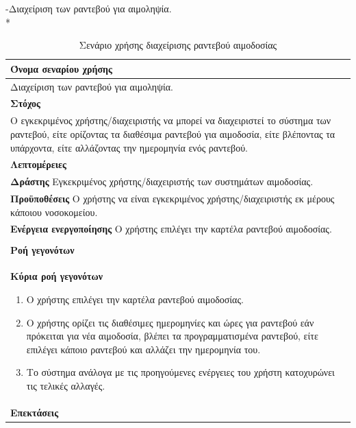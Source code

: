 -Διαχείριση των ραντεβού για αιμοληψία.
\\*
\begin{table}[H]
	\begin{center}
	    \begin{tabular}{|p{\dimexpr \linewidth-2\tabcolsep}|}
	    \hline
	    \rowcolor{grayy}
	    \textbf{Όνομα σεναρίου χρήσης}
	    \\ \hline    
	     Διαχείριση των ραντεβού για αιμοληψία.
	     \\ \hline
	    \rowcolor{grayy}
	    \textbf{\textbf{Στόχος}}
	    \\ \hline
	 	 Ο εγκεκριμένος χρήστης/διαχειριστής να μπορεί να διαχειριστεί το σύστημα των ραντεβού, είτε ορίζοντας τα διαθέσιμα ραντεβού για αιμοδοσία, είτε βλέποντας τα υπάρχοντα, είτε αλλάζοντας την ημερομηνία ενός ραντεβού.
	    \\ \hline
	    \rowcolor{grayy}
	    \textbf{Λεπτομέρειες}
	    \\ \hline
		\textbf{Δράστης} Εγκεκριμένος χρήστης/διαχειριστής των συστημάτων αιμοδοσίας.
		\\*
		\textbf{Προϋποθέσεις} Ο χρήστης να είναι εγκεκριμένος χρήστης/διαχειριστής εκ μέρους κάποιου νοσοκομείου.
		\\*
		\textbf{Ενέργεια ενεργοποίησης} Ο χρήστης επιλέγει την καρτέλα ραντεβού αιμοδοσίας.
		\\ \hline
	    \\ \hline
		\rowcolor{grayy}    
	    \textbf{Ροή γεγονότων}
	    \\* 
		\textbf{Κύρια ροή γεγονότων}
		\begin{enumerate}
			\item	 Ο χρήστης επιλέγει την καρτέλα ραντεβού αιμοδοσίας.
			\item  Ο χρήστης ορίζει τις διαθέσιμες ημερομηνίες και ώρες για ραντεβού εάν πρόκειται για νέα  αιμοδοσία, βλέπει τα προγραμματισμένα ραντεβού, είτε επιλέγει κάποιο ραντεβού και αλλάζει την ημερομηνία του. 
			\item Το σύστημα ανάλογα με τις προηγούμενες ενέργειες του χρήστη κατοχυρώνει τις τελικές αλλαγές.
		\end{enumerate}
		\\*
		\textbf{Επεκτάσεις}
		   \\ \hline
	    \end{tabular}
	    \caption{Σενάριο χρήσης διαχείρισης ραντεβού αιμοδοσίας}
	    \label{tab:blood_donation_reservation_management_superadmin} 
	\end{center}
\end{table}	



